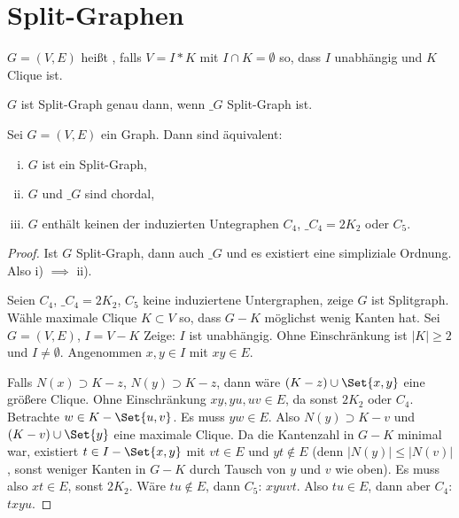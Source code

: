\section{Split-Graphen}

\begin{df}
    $G = (V, E)$ heißt , falls $V = I \ast K$ mit $I \cap K = \emptyset$ so, dass $I$ unabhängig und $K$ Clique ist.
\end{df}

\begin{lem}
    $G$ ist Split-Graph genau dann, wenn $\_G$ Split-Graph ist.
\end{lem}

\begin{st}
    Sei $G = (V, E)$ ein Graph.
    Dann sind äquivalent:
    \begin{enumerate}[i)]
        \item
            $G$ ist ein Split-Graph,
        \item
            $G$ und $\_G$ sind chordal,
        \item
            $G$ enthält keinen der induzierten Untegraphen $C_4$, $\_{C_4} = 2 K_2$ oder $C_5$.
    \end{enumerate}
    \begin{proof}
        Ist $G$ Split-Graph, dann auch $\_G$ und es existiert eine simpliziale Ordnung.
        Also i) $\implies$ ii).

        Seien $C_4$, $\_{C_4} = 2 K_2$, $C_5$ keine induziertene Untergraphen, zeige $G$ ist Splitgraph.
        Wähle maximale Clique $K \subset V$ so, dass $G - K$ möglichst wenig Kanten hat.
        Sei $G = (V, E)$, $I = V - K$
        Zeige: $I$ ist unabhängig.
        Ohne Einschränkung ist $|K| \ge 2$ und $I \neq \emptyset$.
        Angenommen $x,y \in I$ mit $xy \in E$.

        Falls $N(x) \supset K - z$, $N(y) \supset K - z$, dann wäre $(K-z) \cup \Set{x,y}$ eine größere Clique.
        Ohne Einschränkung $xy, yu, uv \in E$, da sonst $2K_2$ oder $C_4$.
        Betrachte $w \in K - \Set{u,v}$.
        Es muss $yw \in E$.
        Also $N(y) \supset K - v$ und $(K-v) \cup \Set{y}$ eine maximale Clique.
        Da die Kantenzahl in $G - K$ minimal war, existiert $t \in I - \Set{x,y}$ mit $vt \in E$ und $yt \not\in E$ (denn $|N(y)| \le |N(v)|$, sonst weniger Kanten in $G - K$ durch Tausch von $y$ und $v$ wie oben).
        Es muss also $xt \in E$, sonst $2 K_2$.
        Wäre $tu \not\in E$, dann $C_5$: $xyuvt$.
        Also $tu \in E$, dann aber $C_4$: $txyu$.
    \end{proof}
\end{st}


